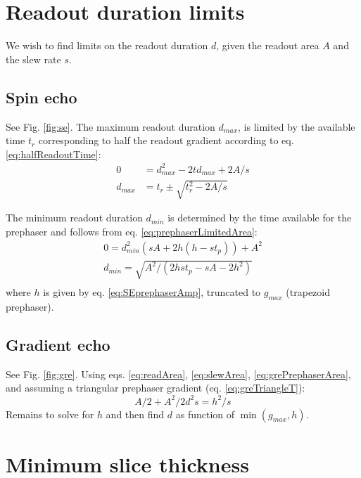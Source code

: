 \documentclass{article}
\begin{document}
\newpage
\section{Readout duration limits}
We wish to find limits on the readout duration $d$, given the readout area $A$ and the slew rate $s$.

\subsection{Spin echo}
See Fig. \ref{fig:se}. 
The maximum readout duration $d_{max}$, is limited by the available time $t_r$ corresponding to half the readout gradient according to eq. \ref{eq:halfReadoutTime}:
\begin{equation}
    \begin{split}
        0 & = d_{max}^2-2td_{max}+2A/s \\
        d_{max} & = t_r \pm \sqrt{t_r^2-2A/s}
    \end{split}
\end{equation}

The minimum readout duration $d_{min}$ is determined by the time available for the prephaser and follows from eq. \ref{eq:prephaserLimitedArea}:
\begin{equation}
    \begin{split}
        0 = d_{min}^2(sA+2h(h-st_p)) + A^2 \\
        d_{min} = \sqrt{A^2/(2hst_p - sA - 2h^2)} \\
    \end{split}
\end{equation}
where $h$ is given by eq. \ref{eq:SEprephaserAmp}, truncated to $g_{max}$ (trapezoid prephaser). 

\subsection{Gradient echo}
See Fig. \ref{fig:gre}. 
Using eqs. \ref{eq:readArea}, \ref{eq:slewArea}, \ref{eq:grePrephaserArea}, and assuming a triangular prephaser gradient (eq. \ref{eq:greTriangleT}):
\begin{equation}
    A/2 + A^2/{2d^2 s} = h^2/s
\end{equation}
Remains to solve for $h$ and then find $d$ as function of $\min(g_{max}, h)$.

\newpage

\section{Minimum slice thickness}
\end{document}
